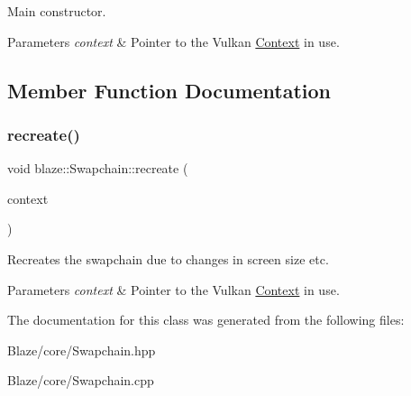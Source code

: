 Main constructor. 


\begin{DoxyParams}{Parameters}
{\em context} & Pointer to the Vulkan \hyperlink{classblaze_1_1Context}{Context} in use. \\
\hline
\end{DoxyParams}


\subsection{Member Function Documentation}
\mbox{\label{classblaze_1_1Swapchain_a1ab37b70fcc07c5dea24486087011314}} 
\subsubsection{\texorpdfstring{recreate()}{recreate()}}
{\footnotesize\ttfamily void blaze\+::\+Swapchain\+::recreate (\begin{DoxyParamCaption}\item[{const \hyperlink{classblaze_1_1Context}{Context} $\ast$}]{context }\end{DoxyParamCaption})\hspace{0.3cm}{\ttfamily [noexcept]}}



Recreates the swapchain due to changes in screen size etc. 


\begin{DoxyParams}{Parameters}
{\em context} & Pointer to the Vulkan \hyperlink{classblaze_1_1Context}{Context} in use. \\
\hline
\end{DoxyParams}


The documentation for this class was generated from the following files\+:\begin{DoxyCompactItemize}
\item 
Blaze/core/Swapchain.\+hpp\item 
Blaze/core/Swapchain.\+cpp\end{DoxyCompactItemize}
